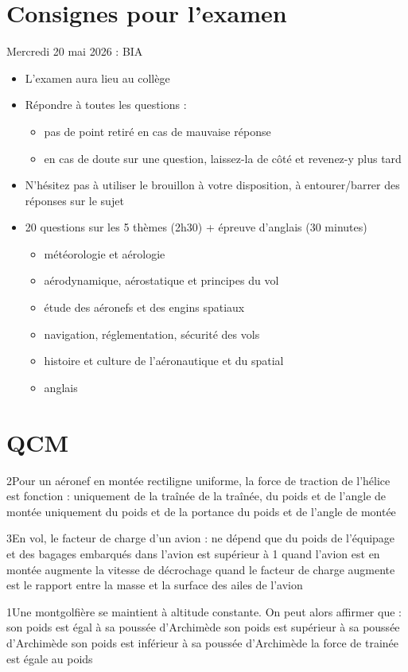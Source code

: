 \section{Consignes pour l'examen}
\begin{frame}{Mercredi 20 mai 2026 : BIA}
\begin{itemize}
	\item L'examen aura lieu au collège
	\item Répondre à toutes les questions :
	\begin{itemize}
		\item pas de point retiré en cas de mauvaise réponse
		\item en cas de doute sur une question, laissez-la de côté et revenez-y plus tard
	\end{itemize}
	\item N'hésitez pas à utiliser le brouillon à votre disposition, à entourer/barrer des réponses sur le sujet
	\item 20 questions sur les 5 thèmes (2h30) + épreuve d'anglais (30 minutes)
	\begin{itemize}
		\item météorologie et aérologie
		\item aérodynamique, aérostatique et principes du vol
		\item étude des aéronefs et des engins spatiaux
		\item navigation, réglementation, sécurité des vols
		\item histoire et culture de l'aéronautique et du spatial
		\item anglais
	\end{itemize}
\end{itemize}

\end{frame}

\section{QCM}
{2}{Pour un aéronef en montée rectiligne uniforme, la force de traction de l'hélice est fonction :}
{uniquement de la traînée}
{de la traînée, du poids et de l'angle de montée}
{uniquement du poids et de la portance}
{du poids et de l'angle de montée} 
{}

{3}{En vol, le facteur de charge d'un avion :}
{ne dépend que du poids de l'équipage et des bagages embarqués dans l'avion}
{est supérieur à 1 quand l'avion est en montée}
{augmente la vitesse de décrochage quand le facteur de charge augmente}
{est le rapport entre la masse et la surface des ailes de l'avion} 
{}

{1}{Une montgolfière se maintient à altitude constante. On peut alors affirmer que :}
{son poids est égal à sa poussée d'Archimède}
{son poids est supérieur à sa poussée d'Archimède}
{son poids est inférieur à sa poussée d'Archimède}
{la force de trainée est égale au poids} 
{}


 
 
 

